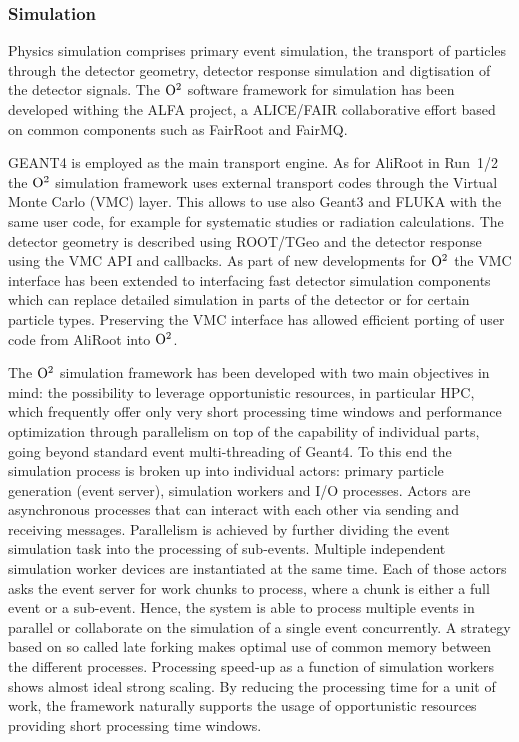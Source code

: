 \subsubsection{Simulation}
Physics simulation comprises primary event simulation, the transport of particles through the detector
geometry, detector response simulation and digtisation of the detector signals.
The ${\rm O}^2$ software framework for simulation has been developed withing the ALFA project, a ALICE/FAIR
collaborative effort based on common components such as FairRoot and FairMQ.

GEANT4 is employed as the main transport engine. As for AliRoot in Run~1/2 the ${\rm O}^2$ simulation
framework uses external transport codes through the Virtual Monte Carlo (VMC) layer. This
allows to use also Geant3 and FLUKA with the same user code, for example for systematic
studies or radiation calculations. The detector geometry is described using ROOT/TGeo and
the detector response using the VMC API and callbacks. As part of new developments for ${\rm O}^2$
the VMC interface has been extended to interfacing fast detector
simulation components which can replace detailed simulation in parts of the detector or
for certain particle types. Preserving the VMC interface has allowed efficient porting of user code from AliRoot into ${\rm O}^2$.

The ${\rm O}^2$ simulation framework has been developed with two main objectives
in mind: the possibility to leverage opportunistic resources, in
particular HPC, which frequently offer only very short processing time
windows and performance optimization through parallelism on top of the capability of individual parts, going beyond standard event multi-threading of Geant4.
To this end the simulation process is broken up into individual actors:
primary particle generation (event server), simulation workers and I/O
processes. Actors are asynchronous processes that can interact with each
other via sending and receiving messages. Parallelism is achieved by
further dividing the event simulation task into the processing of
sub-events. Multiple independent simulation worker devices are
instantiated at the same time. Each of those actors asks the event
server for work chunks to process, where a chunk is either a full event
or a sub-event. Hence, the system is able to process multiple events in
parallel or collaborate on the simulation of a single event
concurrently. A strategy based on so called late forking makes optimal use of common memory between the different processes. Processing speed-up as a function of simulation workers shows almost ideal strong
scaling. By reducing the processing time for a unit of work, the framework naturally supports the usage of opportunistic resources providing short processing time windows.

